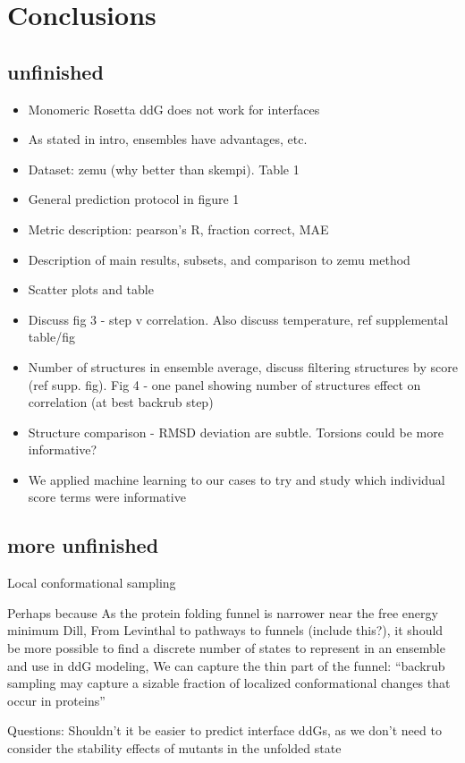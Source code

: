 \section{Conclusions}

\subsection{unfinished}

\begin{itemize}
\item Monomeric Rosetta ddG does not work for interfaces
\item As stated in intro, ensembles have advantages, etc.
\item Dataset: zemu (why better than skempi). Table 1
\item General prediction protocol in figure 1
\item Metric description: pearson’s R, fraction correct, MAE
\item Description of main results, subsets, and comparison to zemu method
\item Scatter plots and table
\item Discuss fig 3 - step v correlation. Also discuss temperature, ref supplemental table/fig
\item Number of structures in ensemble average, discuss filtering structures by score (ref supp. fig). Fig 4 - one panel showing number of structures effect on correlation (at best backrub step)
\item Structure comparison - RMSD deviation are subtle. Torsions could be more informative?
\item We applied machine learning to our cases to try and study which individual score terms were informative
\end{itemize}

\subsection{more unfinished}
Local conformational sampling

Perhaps because
As the protein folding funnel is narrower near the free energy minimum {Dill, From Levinthal to pathways to funnels (include this?)}, it should be more possible to find a discrete number of states to represent in an ensemble and use in ddG modeling,
We can capture the thin part of the funnel:
“backrub sampling may capture a sizable fraction of localized conformational changes that occur in proteins” \cite{humphris_prediction_2008}

Questions:
Shouldn’t it be easier to predict interface ddGs, as we don’t need to consider the stability effects of mutants in the unfolded state
